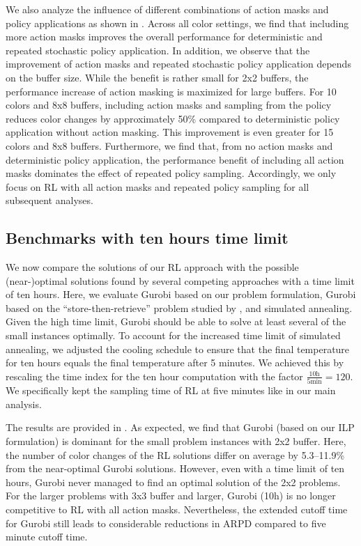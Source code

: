 \documentclass[11pt]{elsarticle}
\begin{document}

We also analyze the influence of different combinations of action masks and policy applications as shown in . Across all color settings, we find that including more action masks improves the overall performance for deterministic and repeated stochastic policy application. In addition, we observe that the improvement of  action masks and repeated stochastic policy application depends on the buffer size. While the benefit is rather small for 2x2 buffers, the performance increase of action masking is maximized for large buffers. For 10 colors and 8x8 buffers, including action masks and sampling from the policy reduces color changes by approximately 50\% compared to deterministic policy application without action masking. This improvement is even greater for 15 colors and 8x8 buffers. Furthermore, we find that, from no action masks and deterministic policy application, the performance benefit of including all action masks dominates the effect of repeated policy sampling. Accordingly, we only focus on RL with all action masks and repeated policy sampling for all subsequent analyses. 


\subsection{Benchmarks with ten hours time limit}


We now compare the solutions of our RL approach with the possible (near-)optimal solutions found by several competing approaches with a time limit of ten hours. Here, we evaluate Gurobi based on our problem formulation, Gurobi based on the ``store-then-retrieve'' problem studied by \citet{wu2021mathematical}, and simulated annealing. Given the high time limit, Gurobi should be able to solve at least several of the small instances optimally. To account for the increased time limit of simulated annealing, we adjusted the cooling schedule to ensure that the final temperature for ten hours equals the final temperature after 5 minutes. We achieved this by rescaling the time index for the ten hour computation with the factor $\frac{10\text{h}}{5\text{min}}=120$. We specifically kept the sampling time of RL at five minutes like in our main analysis.


The results are provided in . As expected, we find that Gurobi (based on our ILP formulation) is dominant for the small problem instances with 2x2 buffer. Here, the number of color changes of the RL solutions differ on average by 5.3--11.9\% from the near-optimal Gurobi solutions. However, even with a time limit of ten hours, Gurobi never managed to find an optimal solution of the 2x2 problems. For the larger problems with 3x3 buffer and larger, Gurobi (10h) is no longer competitive to RL with all action masks. Nevertheless, the extended cutoff time for Gurobi still leads to considerable reductions in ARPD compared to five minute cutoff time.
\end{document}
